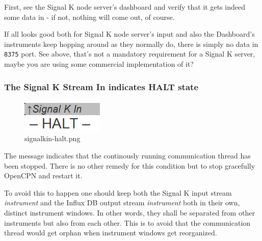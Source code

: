 \documentclass[11pt]{article}
\begin{document}
    First, see the Signal K node server's dashboard and verify that it gets
indeed some data in - if not, nothing will come out, of course.

    If all looks good both for Signal K node server's input and also the
Dashboard's instruments keep hopping around as they normally do, there
is simply no data in \texttt{8375} port. See above, that's not a
mandatory requirement for a Signal K server, maybe you are using some
commercial implementation of it?

    \hypertarget{the-signal-k-stream-in-indicates-halt-state}{%
\subsubsection{The Signal K Stream In indicates HALT
state}\label{the-signal-k-stream-in-indicates-halt-state}}

    \begin{figure}
\centering
\includegraphics{signalkin-halt.png}
\caption{signalkin-halt.png}
\end{figure}

    The message indicates that the continously running communication thread
has been stopped. There is no other remedy for this condition but to
stop gracefully OpenCPN and restart it.

    To avoid this to happen one should keep both the Signal K input stream
\emph{instrument} and the Influx DB output stream \emph{instrument} both
in their own, distinct instrument windows. In other words, they shall be
separated from other instruments but also from each other. This is to
avoid that the communication thread would get orphan when instrument
windows get reorganized.


    
    
    
\end{document}
